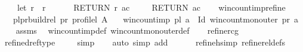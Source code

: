 \begin{isabellebody}
\ \ \ \ let\ r\ {\isacharequal}{\kern0pt}\ r\ {\isacharplus}{\kern0pt}\ {}{\isacharsemicolon}{\kern0pt}\isanewline
\ \ \ \ RETURN\ {\isacharparenleft}{\kern0pt}r{\isacharcomma}{\kern0pt}\ ac{\isacharparenright}{\kern0pt}\isanewline
\ \ {\isacharbraceright}{\kern0pt}{\isacharparenright}{\kern0pt}{\isacharparenleft}{\kern0pt}{}{\isacharcomma}{\kern0pt}{}{\isacharparenright}{\kern0pt}{\isacharsemicolon}{\kern0pt}\isanewline
\ \ RETURN\ ac\isanewline
{\isacharbraceright}{\kern0pt}{\isachardoublequoteclose}\isanewline
\ \ \isanewline
\isanewline
{}\isamarkupfalse%
\ win{\isacharunderscore}{\kern0pt}count{\isacharunderscore}{\kern0pt}imp{\isacharunderscore}{\kern0pt}refine{\isacharcolon}{\kern0pt}\ \isanewline
\ \ \ {\isachardoublequoteopen}{\isacharparenleft}{\kern0pt}pl{\isacharcomma}{\kern0pt}pr{\isacharparenright}{\kern0pt}{\isasymin}build{\isacharunderscore}{\kern0pt}rel\ pr{}{\isacharunderscore}{\kern0pt}{\isasymalpha}\ {\isacharparenleft}{\kern0pt}profile{\isacharunderscore}{\kern0pt}l\ A{\isacharparenright}{\kern0pt}{\isachardoublequoteclose}\isanewline
\ \ \ {\isachardoublequoteopen}win{\isacharunderscore}{\kern0pt}count{\isacharunderscore}{\kern0pt}imp\ pl\ a\ {\isasymle}\ {\isasymDown}Id\ {\isacharparenleft}{\kern0pt}win{\isacharunderscore}{\kern0pt}count{\isacharunderscore}{\kern0pt}mon{\isacharunderscore}{\kern0pt}outer\ pr\ a{\isacharparenright}{\kern0pt}{\isachardoublequoteclose}\isanewline
%
\isadelimproof
\ \ %
\endisadelimproof
%
\isatagproof
{}\isamarkupfalse%
\ assms\ \isamarkupfalse%
\ win{\isacharunderscore}{\kern0pt}count{\isacharunderscore}{\kern0pt}imp{\isacharunderscore}{\kern0pt}def\ win{\isacharunderscore}{\kern0pt}count{\isacharunderscore}{\kern0pt}mon{\isacharunderscore}{\kern0pt}outer{\isacharunderscore}{\kern0pt}def\isanewline
\ \ \isamarkupfalse%
\ {\isacharparenleft}{\kern0pt}refine{\isacharunderscore}{\kern0pt}rcg{\isacharparenright}{\kern0pt}\isanewline
\ \ \isamarkupfalse%
\ {\isacharparenleft}{\kern0pt}refine{\isacharunderscore}{\kern0pt}dref{\isacharunderscore}{\kern0pt}type{\isacharparenright}{\kern0pt}\ %
\isanewline
\ \ \isamarkupfalse%
\ simp\isanewline
\ \ \isamarkupfalse%
\ {\isacharparenleft}{\kern0pt}auto\ simp\ add{\isacharcolon}{\kern0pt}\ \isanewline
\ \ \ \ \ refine{\isacharunderscore}{\kern0pt}hsimp\ refine{\isacharunderscore}{\kern0pt}rel{\isacharunderscore}{\kern0pt}defs{\isacharparenright}{\kern0pt}\isanewline

\end{isabellebody}
